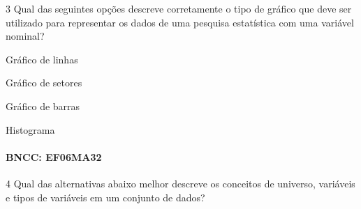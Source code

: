 {%

\num{3}  Qual das seguintes opções descreve corretamente o tipo de gráfico que
deve ser utilizado para representar os dados de uma pesquisa estatística
com uma variável nominal?

\begin{escolha}
\item Gráfico de linhas
\item Gráfico de setores
\item Gráfico de barras
\item Histograma
\end{escolha}

\paragraph{BNCC: EF06MA32}



\num{4}  Qual das alternativas abaixo melhor descreve os conceitos de
universo, variáveis e tipos de variáveis em um conjunto de dados?

}
